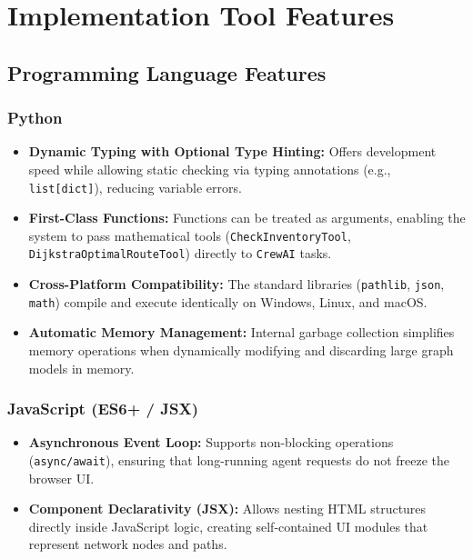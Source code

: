 \section[Implementation Tool Features]{Implementation Tool Features}

\subsection[Programming Language Features]{Programming Language Features}

\subsubsection{Python}
\begin{itemize}
    \item \textbf{Dynamic Typing with Optional Type Hinting:} Offers development speed while allowing static checking via typing annotations (e.g., \texttt{list[dict]}), reducing variable errors.
    \item \textbf{First-Class Functions:} Functions can be treated as arguments, enabling the system to pass mathematical tools (\texttt{CheckInventoryTool}, \texttt{DijkstraOptimalRouteTool}) directly to \texttt{CrewAI} tasks.
    \item \textbf{Cross-Platform Compatibility:} The standard libraries (\texttt{pathlib}, \texttt{json}, \texttt{math}) compile and execute identically on Windows, Linux, and macOS.
    \item \textbf{Automatic Memory Management:} Internal garbage collection simplifies memory operations when dynamically modifying and discarding large graph models in memory.
\end{itemize}

\subsubsection{JavaScript (ES6+ / JSX)}
\begin{itemize}
    \item \textbf{Asynchronous Event Loop:} Supports non-blocking operations (\texttt{async/await}), ensuring that long-running agent requests do not freeze the browser UI.
    \item \textbf{Component Declarativity (JSX):} Allows nesting HTML structures directly inside JavaScript logic, creating self-contained UI modules that represent network nodes and paths.
\end{itemize}

